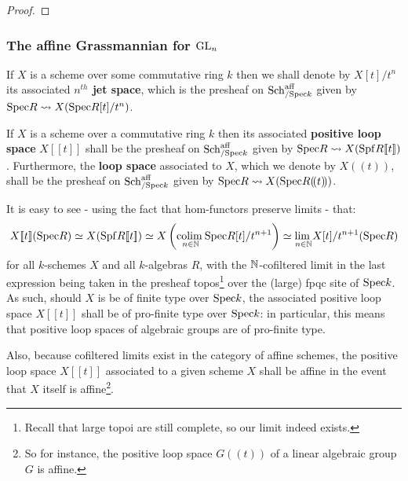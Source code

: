                 \begin{proof}
                    
                \end{proof}
            \begin{remark} \label{remark: ind_schemes_vs_formal_schemes}
                
            \end{remark}
    
        \subsubsection{The affine Grassmannian for \texorpdfstring{$\operatorname{GL}_n$}{}}
            \begin{definition} \label{def: jet_spaces}
                If $X$ is a scheme over some commutative ring $k$ then we shall denote by $X[t]/t^n$ its associated \textbf{$n^{th}$ jet space}, which is the presheaf on $\mathrm{Sch}_{/\mathrm{Spec} k}^{\mathrm{aff}}$ given by $\mathrm{Spec} R \leadsto X(\mathrm{Spec} R[t]/t^n)$.
            \end{definition}
            \begin{definition} \label{def: loop_spaces}
                If $X$ is a scheme over a commutative ring $k$ then its associated \textbf{positive loop space} $X[\![t]\!]$ shall be the presheaf on $\mathrm{Sch}_{/\mathrm{Spec} k}^{\mathrm{aff}}$ given by $\mathrm{Spec} R \leadsto X(\mathrm{Spf} R[\![t]\!])$. Furthermore, the \textbf{loop space} associated to $X$, which we denote by $X(\!(t)\!)$, shall be the presheaf on $\mathrm{Sch}_{/\mathrm{Spec} k}^{\mathrm{aff}}$ given by $\mathrm{Spec} R \leadsto X(\mathrm{Spec} R(\!(t)\!))$.
            \end{definition}
            \begin{remark} \label{remark: loop_spaces_as_cofiltered_limits_of_jet_spaces}
                It is easy to see - using the fact that hom-functors preserve limits - that:
                    $$X[\![t]\!](\mathrm{Spec} R) \simeq X(\mathrm{Spf} R[\![t]\!]) \simeq X\left( \underset{n \in \mathbb{N}}{\operatorname{colim} \:} \mathrm{Spec} R[t]/t^{n + 1} \right) \simeq \underset{n \in \mathbb{N}}{\operatorname{lim} \:} X[t]/t^{n + 1}(\mathrm{Spec} R)$$
                for all $k$-schemes $X$ and all $k$-algebras $R$, with the $\mathbb{N}$-cofiltered limit in the last expression being taken in the presheaf topos\footnote{Recall that large topoi are still complete, so our limit indeed exists.} over the (large) fpqc site of $\mathrm{Spec} k$. As such, should $X$ is be of finite type over $\mathrm{Spec} k$, the associated positive loop space $X[\![t]\!]$ shall be of pro-finite type over $\mathrm{Spec} k$: in particular, this means that positive loop spaces of algebraic groups are of pro-finite type.
                
                Also, because cofiltered limits exist in the category of affine schemes, the positive loop space $X[\![t]\!]$ associated to a given scheme $X$ shall be affine in the event that $X$ itself is affine\footnote{So for instance, the positive loop space $G(\!(t)\!)$ of a linear algebraic group $G$ is affine.}. 
            \end{remark}
